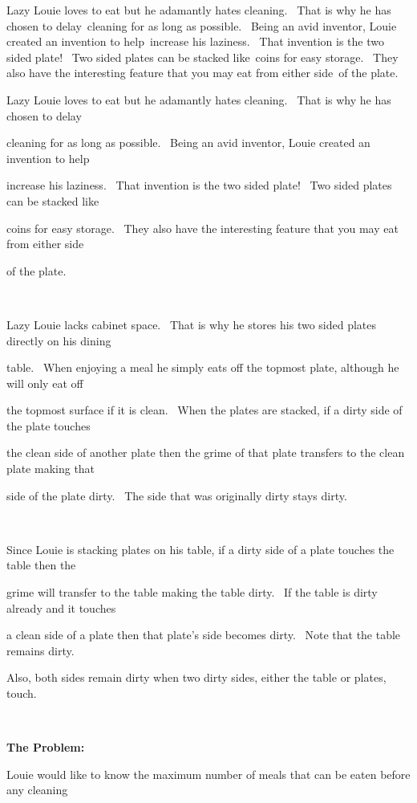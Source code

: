 Lazy Louie loves to eat but he adamantly hates cleaning.  That is why he has chosen to delay cleaning for as long as possible.  Being an avid inventor, Louie created an invention to help increase his laziness.  That invention is the two sided plate!  Two sided plates can be stacked like coins for easy storage.  They also have the interesting feature that you may eat from either side of the plate.

Lazy Louie loves to eat but he adamantly hates cleaning.  That is why he has chosen to delay 

cleaning for as long as possible.  Being an avid inventor, Louie created an invention to help 

increase his laziness.  That invention is the two sided plate!  Two sided plates can be stacked like 

coins for easy storage.  They also have the interesting feature that you may eat from either side 

of the plate.

 

Lazy Louie lacks cabinet space.  That is why he stores his two sided plates directly on his dining 

table.  When enjoying a meal he simply eats off the topmost plate, although he will only eat off 

the topmost surface if it is clean.  When the plates are stacked, if a dirty side of the plate touches 

the clean side of another plate then the grime of that plate transfers to the clean plate making that 

side of the plate dirty.  The side that was originally dirty stays dirty.

 

Since Louie is stacking plates on his table, if a dirty side of a plate touches the table then the 

grime will transfer to the table making the table dirty.  If the table is dirty already and it touches 

a clean side of a plate then that plate’s side becomes dirty.  Note that the table remains dirty. 

Also, both sides remain dirty when two dirty sides, either the table or plates, touch.

 

\textbf{The Problem:}

Louie would like to know the maximum number of meals that can be eaten before any cleaning 

